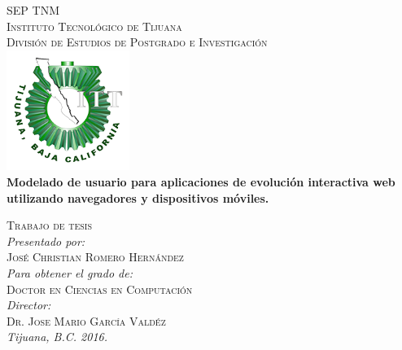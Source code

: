 \documentclass{article}
\begin{document}
 

\begin{center} 
{\textsc{\Large SEP } \hfill  \textsc{\Large TNM}}\\[0.3cm]
	\textsc{\Large Instituto Tecnol\'ogico de Tijuana}\\[0.5cm]
	\textsc{\Large Divisi\'on de Estudios de Postgrado e Investigaci\'on }\\[1.0cm]
	\includegraphics[width=0.3\textwidth]{img/logotec1}\\[0.5cm] %
	{ \LARGE \bfseries Modelado de usuario para aplicaciones de evoluci\'on interactiva web utilizando navegadores y dispositivos m\'oviles.
}\\ [2.0cm]
\end{center}

 \begin{minipage}{1.0\textwidth}
 	\begin{flushright} 
 	\textsc{Trabajo de tesis}\\[0.4cm]
 	\emph{Presentado por:} \\
 	\textsc{ Jos\'e Christian Romero Hern\'andez}\\
	\emph{Para obtener el grado de:} \\
 	\textsc{Doctor en Ciencias en Computaci\'on} \\
	\emph{Director:} \\
 	\textsc{Dr. Jose Mario Garc­\'ia Vald\'ez} \\
	\emph{Tijuana, B.C.  2016.}
 	\end{flushright}
\end{minipage}
\end{document}
